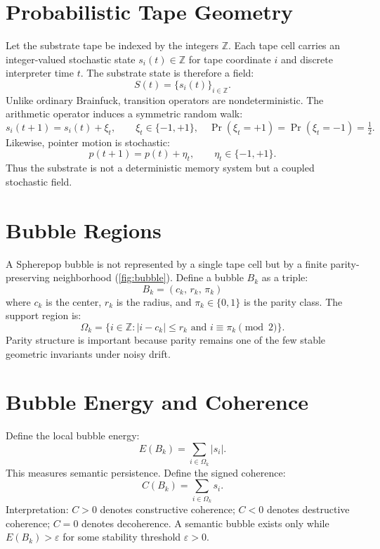 \documentclass[12pt]{article}
\begin{document}
\appendix

\section{Probabilistic Tape Geometry}

Let the substrate tape be indexed by the integers $\mathbb{Z}$. Each tape cell
carries an integer-valued stochastic state $s_i(t) \in \mathbb{Z}$ for tape
coordinate $i$ and discrete interpreter time $t$. The substrate state is
therefore a field:
\[
S(t) = \{ s_i(t) \}_{i \in \mathbb{Z}}.
\]
Unlike ordinary Brainfuck, transition operators are nondeterministic. The
arithmetic operator induces a symmetric random walk:
\[
s_i(t+1) = s_i(t) + \xi_t, \qquad
\xi_t \in \{-1,+1\}, \quad
\Pr(\xi_t = +1) = \Pr(\xi_t = -1) = \tfrac{1}{2}.
\]
Likewise, pointer motion is stochastic:
\[
p(t+1) = p(t) + \eta_t, \qquad \eta_t \in \{-1,+1\}.
\]
Thus the substrate is not a deterministic memory system but a coupled stochastic
field.

\section{Bubble Regions}

A Spherepop bubble is not represented by a single tape cell but by a finite
parity-preserving neighborhood (\cref{fig:bubble}). Define a bubble $B_k$ as a triple:
\[
B_k = (c_k,\, r_k,\, \pi_k)
\]
where $c_k$ is the center, $r_k$ is the radius, and $\pi_k \in \{0,1\}$ is the
parity class. The support region is:
\[
\Omega_k = \bigl\{
i \in \mathbb{Z} : |i - c_k| \le r_k
\text{ and }
i \equiv \pi_k \pmod{2}
\bigr\}.
\]
Parity structure is important because parity remains one of the few stable
geometric invariants under noisy drift.

\section{Bubble Energy and Coherence}

Define the local bubble energy:
\[
E(B_k) = \sum_{i \in \Omega_k} |s_i|.
\]
This measures semantic persistence. Define the signed coherence:
\[
C(B_k) = \sum_{i \in \Omega_k} s_i.
\]
Interpretation: $C > 0$ denotes constructive coherence; $C < 0$ denotes
destructive coherence; $C = 0$ denotes decoherence. A semantic bubble exists
only while $E(B_k) > \varepsilon$ for some stability threshold $\varepsilon > 0$.
\end{document}
